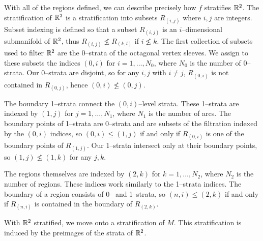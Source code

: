 With all of the regions defined, we can describe precisely how $f$ stratifies $\mathbb{R}^2$.
The stratification of $\mathbb{R}^2$ is a stratification into subsets $R_{(i,j)}$ where $i,j$ are integers.
Subset indexing is defined so that a subset $R_{(i,j)}$ is an $i$--dimensional submanifold of $\mathbb{R}^2$, thus $R_{(i,j)}\nleq R_{(k,l)}$ if $i\nleq k$.
The first collection of subsets used to filter $\mathbb{R}^2$ are the 0--strata of the octagonal vertex sleeves.
We assign to these subsets the indices $(0,i)$ for $i=1,\dots, N_0$, where $N_0$ is the number of 0--strata.
Our 0--strata are disjoint, so for any $i,j$ with $i\neq j$, $R_{(0,i)}$ is not contained in $R_{(0,j)}$, hence $(0,i)\nleq (0,j)$.

The boundary 1--strata connect the $(0,i)$--level strata.
These 1--strata are indexed by $(1,j)$ for $j=1,\dots, N_1$, where $N_1$ is the number of arcs.
The boundary points of 1--strata are 0--strata and are subsets of the filtration indexed by the $(0,i)$ indices, so $(0,i)\leq (1,j)$ if and only if $R_{(0,i)}$ is one of the boundary points of $R_{(1,j)}$.
Our 1--strata intersect only at their boundary points, so $(1,j)\nleq(1,k)$ for any $j,k$. 

The regions themselves are indexed by $(2,k)$ for $k=1,\dots, N_2$, where $N_2$ is the number of regions.
These indices work similarly to the 1--strata indices.
The boundary of a region consists of 0-- and 1--strata, so $(n,i)\leq(2,k)$ if and only if $R_{(n,i)}$ is contained in the boundary of $R_{(2,k)}$.

With $\mathbb{R}^2$ stratified, we move onto a stratification of $M$.
This stratification is induced by the preimages of the strata of $\mathbb{R}^2$.

%
%
%
%

